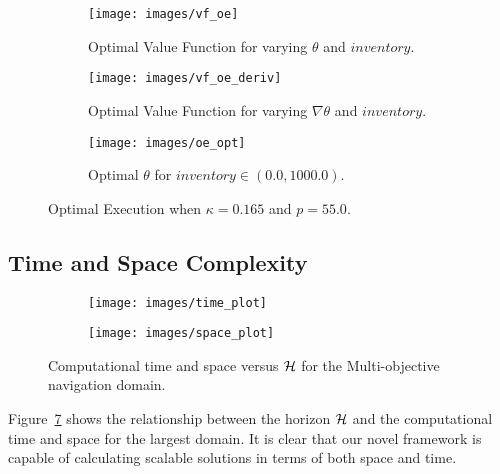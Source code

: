 \begin{figure}[h!]
    \centering
    \begin{subfigure}[b]{0.4\textwidth}    
        \texttt{[image: images/vf\_oe]}
        \caption{Optimal Value Function for varying {\footnotesize $ \theta $} and {\footnotesize $ inventory $}.}
        \label{fig:oe_vf}        
    \end{subfigure}
    
    \begin{subfigure}[b]{0.4\textwidth}    
        \texttt{[image: images/vf\_oe\_deriv]}
        \caption{Optimal Value Function for varying {\footnotesize $\nabla \theta $} and {\footnotesize $ inventory $}.}
        \label{fig:oe_vf_deriv}        
    \end{subfigure}    
    
    \begin{subfigure}[b]{0.4\textwidth}    
        \texttt{[image: images/oe\_opt]}
        \caption{Optimal $ \theta $ for {\footnotesize $ inventory \in \left(0.0, 1000.0 \right) $}.}
        \label{fig:oe_opt}
        
    \end{subfigure}        
        \caption{Optimal Execution when {\footnotesize $ \kappa = 0.165 $} and {\footnotesize $ p = 55.0 $}.}
        \label{fig:oe}    
\end{figure}

\subsection{Time and Space Complexity}

\begin{figure}[h!]
    \centering
    \begin{subfigure}[b]{0.4\textwidth}    
        \texttt{[image: images/time\_plot]}
        \label{fig:time_complexity}        
    \end{subfigure}
    
    \begin{subfigure}[b]{0.4\textwidth}    
        \texttt{[image: images/space\_plot]}
        \label{fig:space_complexity}        
    \end{subfigure}    
    \caption{Computational time and space versus {\footnotesize $ \mathcal{H} $} for the Multi-objective navigation domain.}
    \label{fig:time_space_complexity}    
\end{figure}

Figure~\ref{fig:time_space_complexity} shows the relationship between the horizon $ \mathcal{H} $ and the computational time and space for the largest domain. It is clear that our novel framework is capable of calculating scalable solutions in terms of both space and time.

